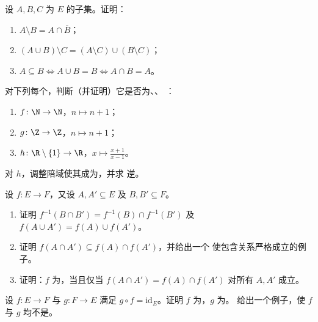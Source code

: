 \begin{exercise}[$\star$]\label{exo:b1:logic:6}
设 $A, B, C$ 为 $E$ 的子集。证明：
\begin{enumerate}
  \item $A \setminus B = A \cap \overline{B}$；
  \item $(A \cup B) \setminus C = (A \setminus C) \cup (B \setminus
        C)$；
  \item $A \subseteq B \iff A \cup B = B \iff A \cap B = A$。
\end{enumerate}
\end{exercise}

\begin{exercise}[$\star\star$]\label{exo:b1:logic:7}
对下列每个，判断（并证明）它是否为、、
：
\begin{enumerate}
  \item $f \colon \N \to \N$，$n \mapsto n + 1$；
  \item $g \colon \Z \to \Z$，$n \mapsto n + 1$；
  \item $h \colon \R \setminus \{1\} \to \R$，$x \mapsto
        \frac{x+1}{x-1}$。
\end{enumerate}
对 $h$，调整陪域使其成为，并求
逆。
\end{exercise}

\begin{exercise}[$\star\star$]\label{exo:b1:logic:8}
设 $f \colon E \to F$，又设 $A, A' \subseteq E$ 及 $B, B' \subseteq
F$。
\begin{enumerate}
  \item 证明 $f^{-1}(B \cap B') = f^{-1}(B) \cap f^{-1}(B')$ 及
        $f(A \cup A') = f(A) \cup f(A')$。
  \item 证明 $f(A \cap A') \subseteq f(A) \cap f(A')$，并给出一个
        使包含关系严格成立的例子。
  \item 证明：$f$ 为，当且仅当 $f(A \cap A') = f(A)
        \cap f(A')$ 对所有 $A, A'$ 成立。
\end{enumerate}
\end{exercise}

\begin{exercise}[$\star\star$]\label{exo:b1:logic:9}
设 $f \colon E \to F$ 与 $g \colon F \to E$ 满足 $g \circ f =
\mathrm{id}_E$。证明 $f$ 为，$g$ 为。
给出一个例子，使 $f$ 与 $g$ 均不是。
\end{exercise}


